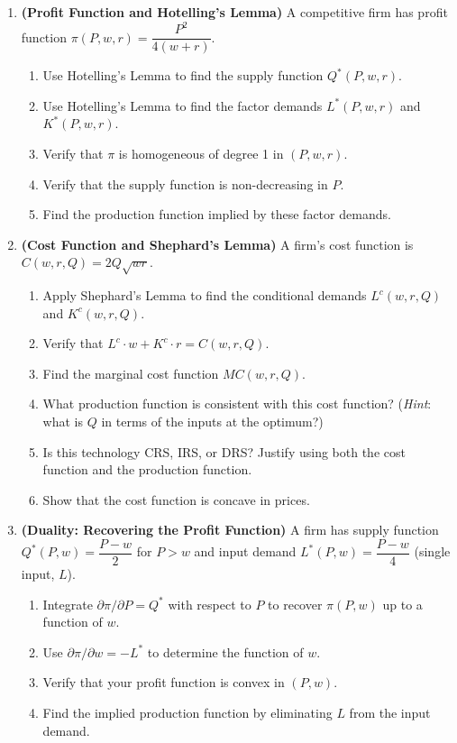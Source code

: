 \documentclass[12pt, a4paper]{article}
\theoremstyle{definition}
\begin{document}
\begin{enumerate}[label=\textbf{B\arabic*.}, leftmargin=2.5em]

\item \textbf{(Profit Function and Hotelling's Lemma)}
A competitive firm has profit function
$\pi(P,w,r) = \dfrac{P^2}{4(w+r)}$.
\begin{enumerate}[label=(\alph*)]
  \item Use Hotelling's Lemma to find the supply function $Q^*(P,w,r)$.
  \item Use Hotelling's Lemma to find the factor demands $L^*(P,w,r)$
        and $K^*(P,w,r)$.
  \item Verify that $\pi$ is homogeneous of degree 1 in $(P,w,r)$.
  \item Verify that the supply function is non-decreasing in $P$.
  \item Find the production function implied by these factor demands.
\end{enumerate}

\item \textbf{(Cost Function and Shephard's Lemma)}
A firm's cost function is $C(w,r,Q) = 2Q\sqrt{wr}$.
\begin{enumerate}[label=(\alph*)]
  \item Apply Shephard's Lemma to find the conditional demands
        $L^c(w,r,Q)$ and $K^c(w,r,Q)$.
  \item Verify that $L^c \cdot w + K^c \cdot r = C(w,r,Q)$.
  \item Find the marginal cost function $MC(w,r,Q)$.
  \item What production function is consistent with this cost function?
        (\textit{Hint}: what is $Q$ in terms of the inputs at the optimum?)
  \item Is this technology CRS, IRS, or DRS? Justify using both the cost
        function and the production function.
  \item Show that the cost function is concave in prices.
\end{enumerate}

\item \textbf{(Duality: Recovering the Profit Function)}
A firm has supply function $Q^*(P,w) = \dfrac{P-w}{2}$ for $P>w$ and
input demand $L^*(P,w) = \dfrac{P-w}{4}$ (single input, $L$).
\begin{enumerate}[label=(\alph*)]
  \item Integrate $\partial\pi/\partial P = Q^*$ with respect to $P$ to
        recover $\pi(P,w)$ up to a function of $w$.
  \item Use $\partial\pi/\partial w = -L^*$ to determine the function of $w$.
  \item Verify that your profit function is convex in $(P,w)$.
  \item Find the implied production function by eliminating $L$ from
        the input demand.
\end{enumerate}

\end{enumerate}
\newpage
\end{document}
